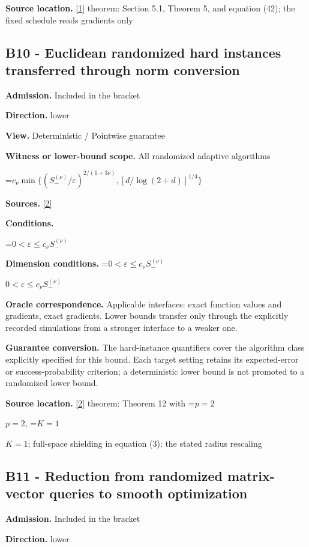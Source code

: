 \documentclass[10pt,a4paper]{article}
\newcommand{\AtlasMath}[1]{\par\begingroup\centering\setbox0=\hbox{$\displaystyle #1$}\ifdim\wd0>1.4\linewidth\typeout{ATLAS WIDE FORMULA: \the\wd0}\fi\ifdim\wd0>\linewidth\resizebox{\linewidth}{!}{\box0}\else\box0\fi\par\endgroup}
\newcommand{\AtlasInlineMath}[1]{\begingroup\setbox0=\hbox{$#1$}\ifdim\wd0>.4\linewidth\endgroup\AtlasMath{#1}\else\endgroup$#1$\fi}
\begin{document}
\textbf{Source location.} \href{https://optimization-online.org/wp-content/uploads/2010/12/2865.pdf}{[1]} theorem: Section 5.1, Theorem 5, and equation (42); the fixed schedule reads gradients only

\subsection{B10 - Euclidean randomized hard instances transferred through norm conversion}
\textbf{Admission.} Included in the bracket

\textbf{Direction.} lower

\textbf{View.} Deterministic / Pointwise guarantee

\textbf{Witness or lower-bound scope.} All randomized adaptive algorithms

\AtlasMath{c_\nu\min\{(S_-^{(\nu)}/\varepsilon)^{2/(1+3\nu)},[d/\log(2+d)]^{1/4}\}}
\textbf{Sources.} \href{https://proceedings.mlr.press/v99/diakonikolas19c/diakonikolas19c.pdf}{[2]}

\textbf{Conditions.} 
\AtlasMath{0<\varepsilon\le c_\nu S_-^{(\nu)}}


\textbf{Dimension conditions.} \AtlasInlineMath{0<\varepsilon\le c_\nu S_-^{(\nu)}}

\textbf{Oracle correspondence.} Applicable interfaces: exact function values and gradients, exact gradients. Lower bounds transfer only through the explicitly recorded simulations from a stronger interface to a weaker one.

\textbf{Guarantee conversion.} The hard-instance quantifiers cover the algorithm class explicitly specified for this bound. Each target setting retains its expected-error or success-probability criterion; a deterministic lower bound is not promoted to a randomized lower bound.

\textbf{Source location.} \href{https://proceedings.mlr.press/v99/diakonikolas19c/diakonikolas19c.pdf}{[2]} theorem: Theorem 12 with \AtlasInlineMath{p=2}, \AtlasInlineMath{K=1}; full-space shielding in equation (3); the stated radius rescaling

\subsection{B11 - Reduction from randomized matrix-vector queries to smooth optimization}
\textbf{Admission.} Included in the bracket

\textbf{Direction.} lower
\end{document}
